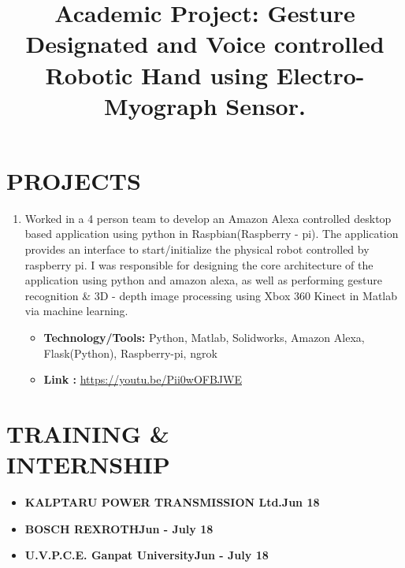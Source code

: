 \documentclass[margin]{res}
\begin{document}
\begin{resume}
    \section{PROJECTS}
    \begin{enumerate}
        \item 
    \location{}
    \title{\textbf{Academic Project: Gesture Designated and Voice controlled Robotic Hand using Electro-Myograph Sensor.}}
    \begin{position}
        Worked in a 4 person team to develop an Amazon Alexa controlled desktop based application using python in Raspbian(Raspberry - pi). The application provides an interface to start/initialize the physical robot controlled by raspberry pi. I was responsible for designing the core architecture of the application using python and amazon alexa, as well as performing gesture recognition \& 3D - depth image processing using Xbox 360 Kinect in Matlab via machine learning.
    \begin{itemize}
    \item \textbf{Technology/Tools:} Python, Matlab, Solidworks, Amazon Alexa,\\ 
    Flask(Python), Raspberry-pi, ngrok
    \item \textbf{Link :} \href{https://youtu.be/Pii0wOFBJWE}{https://youtu.be/Pii0wOFBJWE}
    \end{itemize}
    \end{position}
    \end{enumerate}
        
    \section{TRAINING \& \\INTERNSHIP}
    \begin{itemize}
        \item \textbf{KALPTARU POWER TRANSMISSION Ltd.\hfill{Jun 18}\\}
        \item \textbf{BOSCH REXROTH\hfill{Jun - July 18}\\}
        \item \textbf{U.V.P.C.E. Ganpat University\hfill{Jun - July 18}}
    \end{itemize}
    \end{resume}
\end{document}
